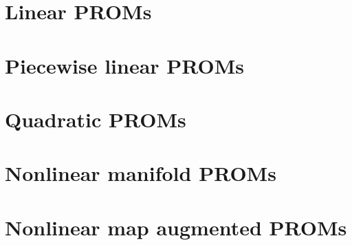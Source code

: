 
\section{Linear PROMs}
\section{Piecewise linear PROMs}
\section{Quadratic PROMs}
\section{Nonlinear manifold PROMs}
\section{Nonlinear map augmented PROMs}